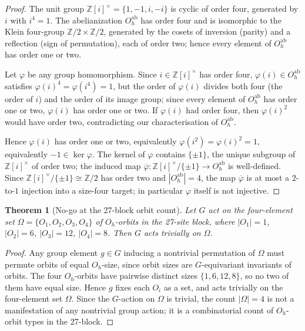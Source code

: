 \documentclass[11pt,reqno]{amsart}
\theoremstyle{plain}
\newtheorem{theorem}{Theorem}[section]
\theoremstyle{definition}
\theoremstyle{remark}
\numberwithin{equation}{section}
\begin{document}
\begin{proof}
The unit group $\mathbb{Z}[i]^{\times} = \{1, -1, i, -i\}$ is
cyclic of order four, generated by $i$ with $i^{4} = 1$. The
abelianization $O_{h}^{\mathrm{ab}}$ has order four
\cite[\S\,VI.2]{johnston-group-theory} and is isomorphic to the
Klein four-group $\mathbb{Z}/2 \times \mathbb{Z}/2$, generated by
the cosets of inversion (parity) and a reflection (sign of
permutation), each of order two; hence every element of
$O_{h}^{\mathrm{ab}}$ has order one or two.

Let $\varphi$ be any group homomorphism. Since $i \in \mathbb{Z}[i]
^{\times}$ has order four, $\varphi(i) \in O_{h}^{\mathrm{ab}}$
satisfies $\varphi(i)^{4} = \varphi(i^{4}) = 1$, but the order of
$\varphi(i)$ divides both four (the order of $i$) and the order of
its image group; since every element of $O_{h}^{\mathrm{ab}}$ has
order one or two, $\varphi(i)$ has order one or two. If
$\varphi(i)$ had order four, then $\varphi(i)^{2}$ would have order
two, contradicting our characterisation of
$O_{h}^{\mathrm{ab}}$.

Hence $\varphi(i)$ has order one or two, equivalently $\varphi(i^{2})
= \varphi(i)^{2} = 1$, equivalently $-1 \in \ker \varphi$. The
kernel of $\varphi$ contains $\{\pm 1\}$, the unique subgroup of
$\mathbb{Z}[i]^{\times}$ of order two; the induced map $\overline{\varphi}
\colon \mathbb{Z}[i]^{\times} / \{\pm 1\} \to O_{h}^{\mathrm{ab}}$
is well-defined. Since $\mathbb{Z}[i]^{\times} / \{\pm 1\} \cong
\mathbb{Z}/2$ has order two and $|O_{h}^{\mathrm{ab}}| = 4$, the
map $\overline{\varphi}$ is at most a $2$-to-$1$ injection into a
size-four target; in particular $\varphi$ itself is not injective.
\end{proof}

\begin{theorem}[No-go at the 27-block orbit count]
\label{thm:no-go-orbits}
Let $G$ act on the four-element set $\Omega = \{O_1, O_2, O_3,
O_4\}$ of $O_{h}$-orbits in the 27-site block, where $|O_{1}| = 1$,
$|O_{2}| = 6$, $|O_{3}| = 12$, $|O_{4}| = 8$. Then $G$ acts
trivially on $\Omega$.
\end{theorem}

\begin{proof}
Any group element $g \in G$ inducing a nontrivial permutation of
$\Omega$ must permute orbits of equal $O_{h}$-size, since orbit
sizes are $G$-equivariant invariants of orbits. The four
$O_{h}$-orbits have pairwise distinct sizes $\{1, 6, 12, 8\}$, so
no two of them have equal size. Hence $g$ fixes each $O_{i}$ as a
set, and acts trivially on the four-element set $\Omega$. Since
the $G$-action on $\Omega$ is trivial, the count $|\Omega| = 4$ is
not a manifestation of any nontrivial group action; it is a
combinatorial count of $O_{h}$-orbit types in the 27-block.
\end{proof}
\end{document}
